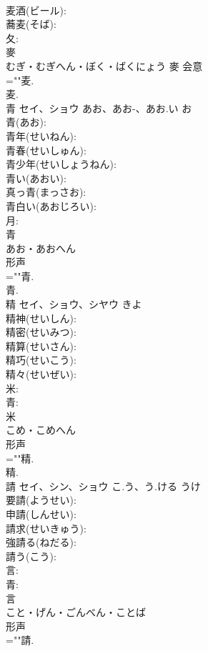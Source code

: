 \documentclass[8pt]{extreport}
\begin{document}
\begin{CJK}{UTF8}{min}
\\	麦酒(ビール): 
\\	蕎麦(そば): 
\\	夂: 
\\	麥	
\\	むぎ・むぎへん・ぼく・ばくにょう	麥	会意 
\\	=""麦.
\\	麦.
\\	青	セイ、ショウ	あお、あお-、あお.い	お	
\\	青(あお): 
\\	青年(せいねん): 
\\	青春(せいしゅん): 
\\	青少年(せいしょうねん): 
\\	青い(あおい): 
\\	真っ青(まっさお): 
\\	青白い(あおじろい): 
\\	月: 
\\	青	
\\	あお・あおへん	
\\	形声 
\\	=""青.
\\	青.
\\	精	セイ、ショウ、シヤウ		きよ	
\\	精神(せいしん): 
\\	精密(せいみつ): 
\\	精算(せいさん): 
\\	精巧(せいこう): 
\\	精々(せいぜい): 
\\	米: 
\\	青: 
\\	米	
\\	こめ・こめへん	
\\	形声 
\\	=""精.
\\	精.
\\	請	セイ、シン、ショウ	こ.う、う.ける	うけ	
\\	要請(ようせい): 
\\	申請(しんせい): 
\\	請求(せいきゅう): 
\\	強請る(ねだる): 
\\	請う(こう): 
\\	言: 
\\	青: 
\\	言	
\\	こと・げん・ごんべん・ことば	
\\	形声 
\\	=""請.

\end{CJK}
\end{document}
